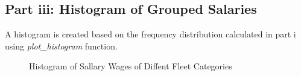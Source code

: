\subsection{Part iii: Histogram of Grouped Salaries}
A histogram is created  based on the frequency distribution calculated in part i
using \textit{plot\_histogram} function.



\begin{figure}[H]
    \centering
    \caption{Histogram of Sallary Wages of Diffent Fleet Categories}
\end{figure}

